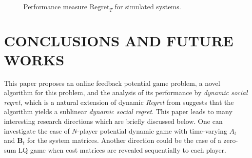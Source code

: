 \documentclass[letterpaper, 10 pt, conference]{ieeeconf}  %
\begin{document}
\begin{figure}
        \label{fig:experiments}
     \centering
    \\
    \caption{Performance measure $\text{Regret}_{T}$ for simulated systems.}
\end{figure}

\section{CONCLUSIONS AND FUTURE WORKS}\label{sec:conclusions}
This paper proposes an online feedback potential game problem, a novel algorithm for this problem, and the analysis of its performance by \emph{dynamic social regret}, which is a natural extension of dynamic \emph{Regret} from \cite[Equation (5)]{chen_regret_2023} suggests that the algorithm yields a sublinear \emph{dynamic social regret}. This paper leads to many interesting research directions which are briefly discussed below. One can investigate the case of $N$-player potential dynamic game with time-varying $A_{t}$ and $\mathbf{B}_{t}$ for the system matrices. Another direction could be the case of a zero-sum LQ game when cost matrices are revealed sequentially to each player.
\end{document}
